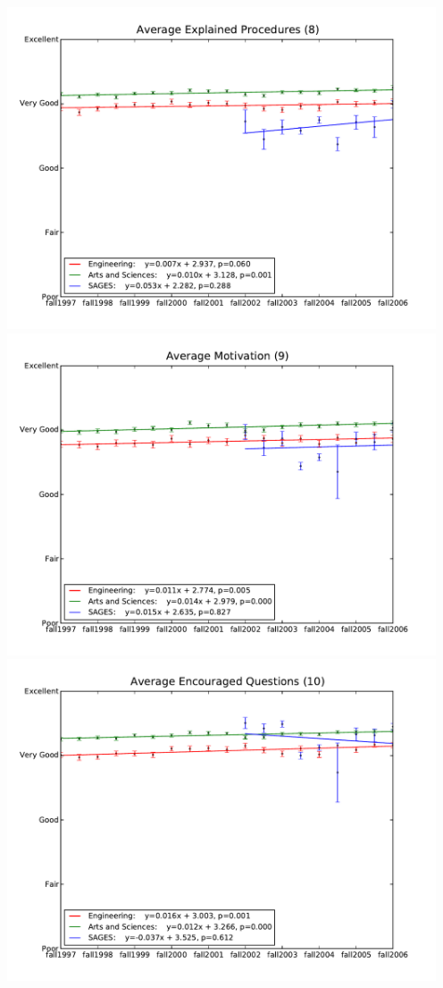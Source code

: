\documentclass[12pt]{article}
\begin{document}
\begin{center}
    \includegraphics[width=5in]{figures/8_procedures_over_time.pdf} \\
    \includegraphics[width=5in]{figures/9_motivation_over_time.pdf} \\
    \includegraphics[width=5in]{figures/10_questions_over_time.pdf} \\

\end{center}
\end{document}
